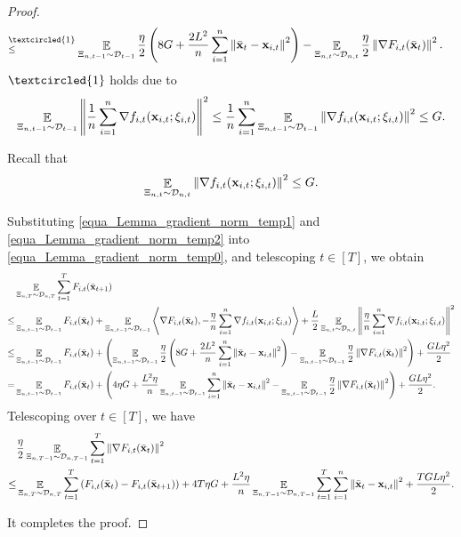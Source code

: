 \documentclass{article}
\begin{document}
\begin{proof}
\begin{align}
\refabovecir{\le}{\textcircled{1}} & \EE_{ \Xi_{n,t-1} \sim \Dcal_{t-1} } \frac{\eta}{2}\lrincir{ 8 G + \frac{2L^2}{n}\sum_{i=1}^n \lrnorm{ \bar{\x}_t - \x_{i,t} }^2 }  - \EE_{ \Xi_{n,t} \sim \Dcal_{n,t} } \frac{\eta}{2} \lrnorm{\nabla F_{i,t}(\bar{\x}_t)}^2.
\end{align} $\textcircled{1}$ holds due to  
\begin{align}
\nonumber
\mathop{\mathbb{E}}_{ \Xi_{n,t-1} \sim \mathcal{D}_{t-1} }\left\lVert\frac{1}{n}\sum_{i=1}^n \nabla  f_{i,t}({\bf x}_{i,t};\xi_{i,t})\right\rVert^2 \le \frac{1}{n}\sum_{i=1}^n  \mathop{\mathbb{E}}_{ \Xi_{n,t-1} \sim \mathcal{D}_{t-1} }\left\lVert\nabla  f_{i,t}({\bf x}_{i,t};\xi_{i,t})\right\rVert^2 \le G.
\end{align}




Recall that
\begin{align}
\label{equa_Lemma_gradient_norm_temp2}
\mathop{\mathbb{E}}_{ \Xi_{n,t} \sim \mathcal{D}_{n,t} }\left\lVert \nabla f_{i,t}({\bf x}_{i,t};\xi_{i,t})\right\rVert^2 \le G.
\end{align}

Substituting \eqref{equa_Lemma_gradient_norm_temp1} and \eqref{equa_Lemma_gradient_norm_temp2} into \eqref{equa_Lemma_gradient_norm_temp0}, and telescoping $t\in[T]$, we obtain
\begin{align}
\nonumber
& \mathop{\mathbb{E}}_{ \Xi_{n,T} \sim \mathcal{D}_{n,T} } \sum_{t=1}^T F_{i,t}(\bar{{\bf x}}_{t+1}) \\ \nonumber
\le & \mathop{\mathbb{E}}_{ \Xi_{n,t-1} \sim \mathcal{D}_{t-1} } F_{i,t}(\bar{{\bf x}}_t) + \mathop{\mathbb{E}}_{ \Xi_{n,t-1} \sim \mathcal{D}_{t-1} }\left\langle\nabla F_{i,t}(\bar{{\bf x}}_t), -\frac{\eta}{n}\sum_{i=1}^n \nabla f_{i,t}({\bf x}_{i,t};\xi_{i,t}) \right\rangle + \frac{L}{2} \mathop{\mathbb{E}}_{ \Xi_{n,t} \sim \mathcal{D}_{n,t} }\left\lVert\frac{\eta}{n}\sum_{i=1}^n \nabla f_{i,t}({\bf x}_{i,t};\xi_{i,t})\right\rVert^2 \\ \nonumber
\le & \mathop{\mathbb{E}}_{ \Xi_{n,t-1} \sim \mathcal{D}_{t-1} } F_{i,t}(\bar{{\bf x}}_t) + \left(  \mathop{\mathbb{E}}_{ \Xi_{n,t-1} \sim \mathcal{D}_{t-1} } \frac{\eta}{2}\left(  8 G + \frac{2L^2}{n}\sum_{i=1}^n \left\lVert \bar{{\bf x}}_t - {\bf x}_{i,t} \right\rVert^2  \right)  - \mathop{\mathbb{E}}_{ \Xi_{n,t-1} \sim \mathcal{D}_{t-1} } \frac{\eta}{2} \left\lVert\nabla F_{i,t}(\bar{{\bf x}}_t)\right\rVert^2  \right) + \frac{GL\eta^2}{2} \\ \nonumber
= & \mathop{\mathbb{E}}_{ \Xi_{n,t-1} \sim \mathcal{D}_{t-1} } F_{i,t}(\bar{{\bf x}}_t) + \left(   4\eta  G + \frac{ L^2 \eta}{n}\mathop{\mathbb{E}}_{ \Xi_{n,t-1} \sim \mathcal{D}_{t-1} }\sum_{i=1}^n \left\lVert \bar{{\bf x}}_t - {\bf x}_{i,t} \right\rVert^2   - \mathop{\mathbb{E}}_{ \Xi_{n,t-1} \sim \mathcal{D}_{t-1} } \frac{\eta}{2} \left\lVert\nabla F_{i,t}(\bar{{\bf x}}_t)\right\rVert^2  \right) + \frac{GL\eta^2}{2}.
\end{align} Telescoping over $t\in[T]$, we have
\begin{align}
& \frac{\eta}{2} \mathop{\mathbb{E}}_{ \Xi_{n,T-1} \sim \mathcal{D}_{n,T-1} }\sum_{t=1}^T \left\lVert\nabla F_{i,t}(\bar{{\bf x}}_t)\right\rVert^2 \\ \nonumber
\le & \mathop{\mathbb{E}}_{ \Xi_{n,T} \sim \mathcal{D}_{n,T} } \sum_{t=1}^T  \left( F_{i,t}(\bar{{\bf x}}_t) - F_{i,t}(\bar{{\bf x}}_{t+1}) \right) + 4T  \eta G + \frac{ L^2 \eta}{n}\mathop{\mathbb{E}}_{ \Xi_{n,T-1} \sim \mathcal{D}_{n,T-1} }\sum_{t=1}^T\sum_{i=1}^n \left\lVert \bar{{\bf x}}_t - {\bf x}_{i,t} \right\rVert^2 + \frac{TGL\eta^2}{2}.
\end{align} 





It completes the proof.
\end{proof}
\end{document}
